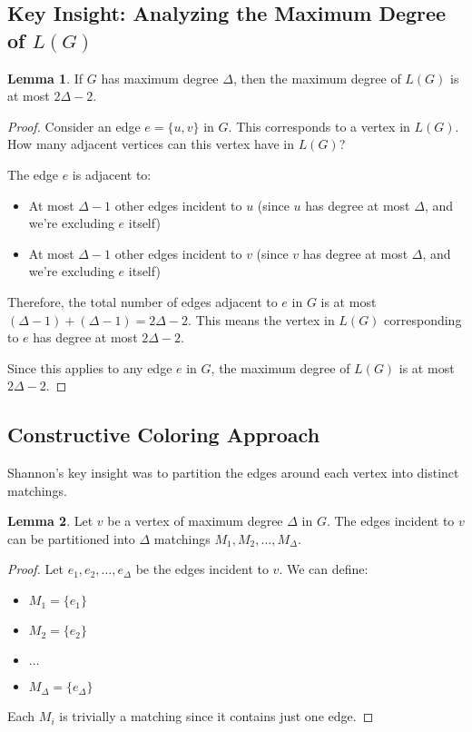 \documentclass{article}
\theoremstyle{definition}
\newtheorem{lemma}{Lemma}
\begin{document}
\subsection* {Key Insight: Analyzing the Maximum Degree of $L(G)$}
\begin{lemma}
If $G$ has maximum degree $\Delta$, then the maximum degree of $L(G)$ is at most $2\Delta - 2$.
\end{lemma}

\begin{proof}
Consider an edge $e = \{u, v\}$ in $G$. This corresponds to a vertex in $L(G)$. How many adjacent vertices can this vertex have in $L(G)$?

The edge $e$ is adjacent to:
\begin{itemize}
    \item At most $\Delta - 1$ other edges incident to $u$ (since $u$ has degree at most $\Delta$, and we're excluding $e$ itself)
    \item At most $\Delta - 1$ other edges incident to $v$ (since $v$ has degree at most $\Delta$, and we're excluding $e$ itself)
\end{itemize}

Therefore, the total number of edges adjacent to $e$ in $G$ is at most $(\Delta - 1) + (\Delta - 1) = 2\Delta - 2$. This means the vertex in $L(G)$ corresponding to $e$ has degree at most $2\Delta - 2$.

Since this applies to any edge $e$ in $G$, the maximum degree of $L(G)$ is at most $2\Delta - 2$.
\end{proof}

\subsection*{Constructive Coloring Approach}

Shannon's key insight was to partition the edges around each vertex into distinct matchings.

\begin{lemma}
Let $v$ be a vertex of maximum degree $\Delta$ in $G$. The edges incident to $v$ can be partitioned into $\Delta$ matchings $M_1, M_2, \ldots, M_\Delta$.
\end{lemma}

\begin{proof}
Let $e_1, e_2, \ldots, e_\Delta$ be the edges incident to $v$. We can define:
\begin{itemize}
    \item $M_1 = \{e_1\}$
    \item $M_2 = \{e_2\}$
    \item $\ldots$
    \item $M_\Delta = \{e_\Delta\}$
\end{itemize}

Each $M_i$ is trivially a matching since it contains just one edge.
\end{proof}
\end{document}
